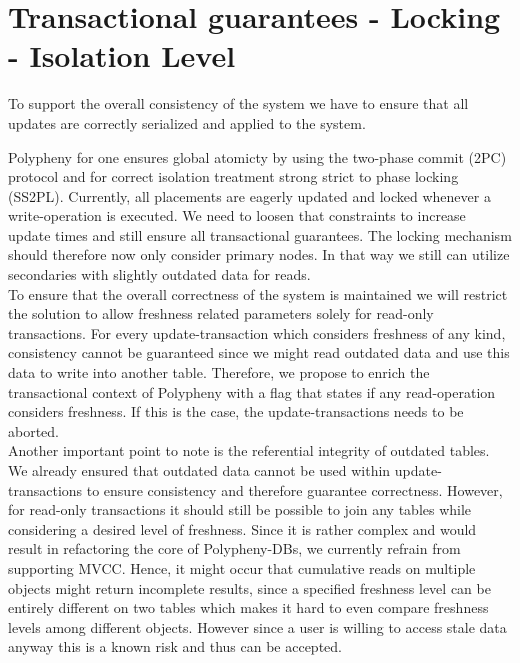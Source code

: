 

\section{Transactional guarantees - Locking - Isolation Level}
\label{consistency}

To support the overall consistency of the system we have to ensure that all updates are correctly serialized and applied to the system.

Polypheny for one ensures global atomicty by using the two-phase commit (2PC) protocol and for correct isolation treatment
strong strict to phase locking (SS2PL). Currently, all placements are eagerly updated and locked whenever a write-operation is executed.
We need to loosen that constraints to increase update times and still ensure all transactional guarantees. The locking mechanism should therefore 
now only consider primary nodes. In that way we still can utilize secondaries with slightly outdated data for reads.\\

To ensure that the overall correctness of the system is maintained we will restrict the solution to allow freshness related parameters solely
for read-only transactions. For every update-transaction which considers freshness of any kind, consistency cannot be guaranteed since we might read outdated data
and use this data to write into another table. Therefore, we propose to enrich  the transactional context of Polypheny with a flag that states if any read-operation 
considers freshness. If this is the case, the update-transactions needs to be aborted.\\


Another important point to note is the referential integrity of outdated tables. We already ensured that outdated data cannot be used within update-transactions to 
ensure consistency and therefore guarantee correctness. However, for read-only transactions it should still be possible to join any tables while considering 
a desired level of freshness. 
Since it is rather complex and would result in refactoring the core of Polypheny-DBs, we currently refrain from supporting MVCC.
Hence, it might occur that cumulative reads on multiple objects might return incomplete results, since a specified freshness
level can be entirely different on two tables which makes it hard to even compare freshness levels among different objects. However since a user is willing to access 
stale data anyway this is a known risk and thus can be accepted.\\

